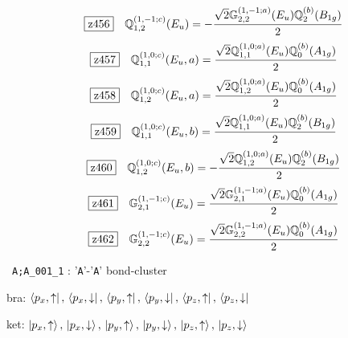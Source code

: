 \documentclass[fleqn,10pt,landscape]{jsarticle}
\begin{document}
\begin{dmath*}
\hspace*{3mm}\fbox{z456}\quad \mathbb{Q}_{1,2}^{(1,-1;c)}(E_{u})=- \frac{\sqrt{2} \mathbb{G}_{2,2}^{(1,-1;a)}(E_{u}) \mathbb{Q}_{2}^{(b)}(B_{1g})}{2}
\end{dmath*}
\begin{dmath*}
\hspace*{3mm}\fbox{z457}\quad \mathbb{Q}_{1,1}^{(1,0;c)}(E_{u},a)=\frac{\sqrt{2} \mathbb{Q}_{1,1}^{(1,0;a)}(E_{u}) \mathbb{Q}_{0}^{(b)}(A_{1g})}{2}
\end{dmath*}
\begin{dmath*}
\hspace*{3mm}\fbox{z458}\quad \mathbb{Q}_{1,2}^{(1,0;c)}(E_{u},a)=\frac{\sqrt{2} \mathbb{Q}_{1,2}^{(1,0;a)}(E_{u}) \mathbb{Q}_{0}^{(b)}(A_{1g})}{2}
\end{dmath*}
\begin{dmath*}
\hspace*{3mm}\fbox{z459}\quad \mathbb{Q}_{1,1}^{(1,0;c)}(E_{u},b)=\frac{\sqrt{2} \mathbb{Q}_{1,1}^{(1,0;a)}(E_{u}) \mathbb{Q}_{2}^{(b)}(B_{1g})}{2}
\end{dmath*}
\begin{dmath*}
\hspace*{3mm}\fbox{z460}\quad \mathbb{Q}_{1,2}^{(1,0;c)}(E_{u},b)=- \frac{\sqrt{2} \mathbb{Q}_{1,2}^{(1,0;a)}(E_{u}) \mathbb{Q}_{2}^{(b)}(B_{1g})}{2}
\end{dmath*}
\begin{dmath*}
\hspace*{3mm}\fbox{z461}\quad \mathbb{G}_{2,1}^{(1,-1;c)}(E_{u})=\frac{\sqrt{2} \mathbb{G}_{2,1}^{(1,-1;a)}(E_{u}) \mathbb{Q}_{0}^{(b)}(A_{1g})}{2}
\end{dmath*}
\begin{dmath*}
\hspace*{3mm}\fbox{z462}\quad \mathbb{G}_{2,2}^{(1,-1;c)}(E_{u})=\frac{\sqrt{2} \mathbb{G}_{2,2}^{(1,-1;a)}(E_{u}) \mathbb{Q}_{0}^{(b)}(A_{1g})}{2}
\end{dmath*}
\vspace{5mm}

\noindent\textbullet\, \texttt{A;A_001_1} : '\texttt{A}'-'\texttt{A}' bond-cluster

\noindent\quad * bra: $\bra{p_{x},\uparrow},\, \bra{p_{x},\downarrow},\, \bra{p_{y},\uparrow},\, \bra{p_{y},\downarrow},\, \bra{p_{z},\uparrow},\, \bra{p_{z},\downarrow}$

\noindent\quad * ket: $\ket{p_{x},\uparrow},\, \ket{p_{x},\downarrow},\, \ket{p_{y},\uparrow},\, \ket{p_{y},\downarrow},\, \ket{p_{z},\uparrow},\, \ket{p_{z},\downarrow}$
\end{document}
